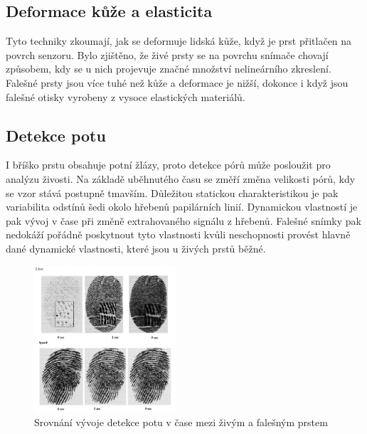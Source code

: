 \subsection*{Deformace kůže a elasticita}
Tyto techniky zkoumají, jak se deformuje lidská kůže, když je prst přitlačen na povrch senzoru. Bylo zjištěno, že živé prsty se na povrchu snímače chovají způsobem, kdy se u nich projevuje značné množství nelineárního zkreslení. Falešné prsty jsou více tuhé než kůže a deformace je nižší, dokonce i když jsou falešné otisky vyrobeny z vysoce elastických materiálů. \cite{BiometricsEncyclopedia2009}

\subsection*{Detekce potu}
I bříško prstu obsahuje potní žlázy, proto detekce pórů může posloužit pro analýzu živosti. Na základě uběhnutého času se změří změna velikosti pórů, kdy se vzor stává postupně tmavším. Důležitou statickou charakteristikou je pak variabilita odstínů šedi okolo hřebenů papilárních linií. Dynamickou vlastností je pak vývoj v čase při změně extrahovaného signálu z hřebenů. Falešné snímky pak nedokáží pořádně poskytnout tyto vlastnosti kvůli neschopnosti provést hlavně dané dynamické vlastnosti, které jsou u živých prstů běžné. \cite{PoresResearch}

\begin{figure}[!htbp]
    \centering
    \includegraphics[width=200px]{obrazky-figures/pores.png}
    \caption{Srovnání vývoje detekce potu v čase mezi živým a falešným prstem \cite{PoresResearch}}
\end{figure}


